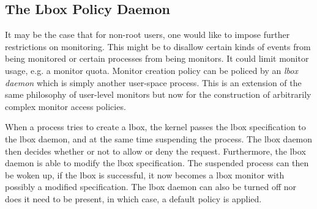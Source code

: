 \subsection{The Lbox Policy Daemon}

It may be the case that for non-root users, one would like to impose
further restrictions on monitoring. This might be to disallow certain
kinds of events from being monitored or certain processes from being monitors.
It could limit monitor usage, e.g. a monitor quota.
Monitor creation policy can be policed by an {\em lbox daemon}
which is simply another user-space process.
This is an extension of the same philosophy of user-level monitors but
now for the construction of
arbitrarily complex monitor access policies.

When a process tries to create a lbox, the kernel passes the lbox
specification to the lbox daemon, and at the same time suspending the process.
The lbox daemon then decides whether or not to allow or deny the request.
Furthermore, the lbox daemon is able to modify the lbox specification.
The suspended process can then be woken up, if the lbox is successful,
it now becomes a lbox monitor with possibly a modified specification.
The lbox daemon can also be turned off nor does it need to be present, 
in which case, a default policy is applied.



